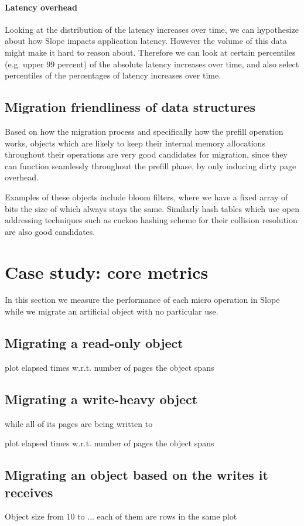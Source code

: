 \paragraph{Latency overhead}
Looking at the distribution of the latency increases over time, we can
hypothesize about how Slope impacts application latency. However the volume of
this data might make it hard to reason about. Therefore we can look at certain
percentiles (e.g. upper 99 percent) of the absolute latency increases over time,
and also select percentiles of the percentages of latency increases over time.


\subsection{Migration friendliness of data structures}
Based on how the migration process and specifically how the prefill operation
works, objects which are likely to keep their internal memory allocations
throughout their operations are very good candidates for migration, since they
can function seamlessly throughout the prefill phase, by only inducing dirty
page overhead.

Examples of these objects include bloom filters, where we have a fixed
array of bits the size of which always stays the same.
Similarly hash tables which use open addressing techniques such as cuckoo
hashing scheme for their collision resolution are also good candidates.

\section{Case study: core metrics}
In this section we measure the performance of each micro operation in Slope
while we migrate an artificial object with no particular use.

\subsection{Migrating a read-only object}
plot elapsed times w.r.t. number of pages the object spans

\subsection{Migrating a write-heavy object}
while all of its pages are being written to

plot elapsed times w.r.t. number of pages the object spans

\subsection{Migrating an object based on the writes it receives}
Object size from 10 to ... each of them are rows in the same plot

